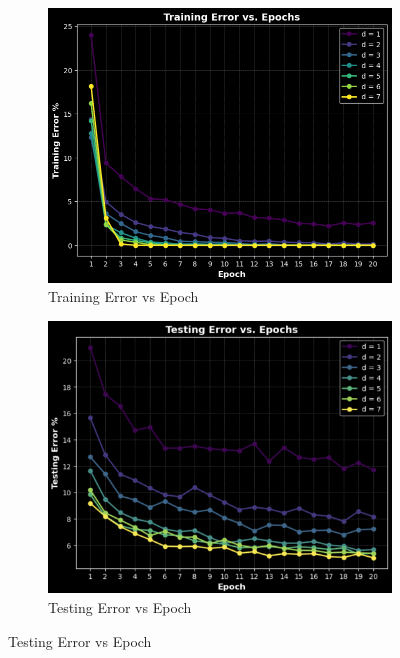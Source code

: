 \documentclass[final,3p,times,12pt]{article}
\begin{document}
\begin{figure}[H]
    \centering
    \begin{subfigure}[b]{0.45\linewidth}
        \centering
        \includegraphics[width=\linewidth]{images/training_error_vs_epoch.png}
        \caption{Training Error vs Epoch}
        \label{fig:training-error}
    \end{subfigure}
    \hfill
    \begin{subfigure}[b]{0.45\linewidth}
        \centering
        \includegraphics[width=\linewidth]{images/testing_error_vs_epoch.png}
        \caption{Testing Error vs Epoch}
        \label{fig:testing-error}
    \end{subfigure}
    \label{fig:side-by-side}
\end{figure}
\end{document}
